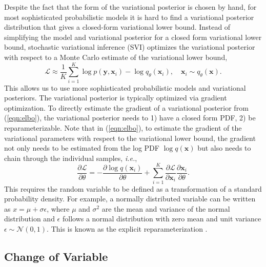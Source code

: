 \documentclass{article}
\newcommand{\yV}{\mathbf{y}}
\newcommand{\xV}{\mathbf{x}}
\newcommand{\bound}{\mathcal{L}}
\newcommand{\ie}{\textit{i.e.}}
\begin{document}
Despite the fact that the form of the variational posterior is chosen by hand, for most sophisticated probabilistic models it is hard to find a variational posterior distribution that gives a closed-form variational lower bound. Instead of simplifying the model and variational posterior for a closed form variational lower bound, stochastic variational inference (SVI) optimizes the variational posterior with respect to a Monte Carlo estimate of the variational lower bound,
\begin{equation}
\bound \approx \frac{1}{K} \sum_{i=1}^K \log p(\yV, \xV_i)-\log q_\theta(\xV_i), \quad \xV_i \sim q_\theta(\xV). \label{eqn:elbo}
\end{equation}
This allows us to use more sophisticated probabilistic models and variational posteriors. The variational posterior is typically optimized via gradient optimization. To directly estimate the gradient of a variational posterior from (\ref{eqn:elbo}), the variational posterior needs to 1) have a closed form PDF, 2) be reparameterizable.
%
Note that in (\ref{eqn:elbo}), to estimate the gradient of the variational parameters with respect to the variational lower bound, the gradient not only needs to be estimated from the log PDF $\log q(\xV)$ but also needs to chain through the individual samples, \ie, 
\begin{equation}
\frac{\partial \bound}{\partial \theta} = -\frac{\partial \log q(\xV_i)}{\partial \theta} + \sum_{i=1}^K \frac{\partial \bound}{\partial \xV_i} \frac{\partial \xV_i}{\partial \theta}. 
\end{equation}
%
This requires the random variable to be defined as a transformation of a standard probability density. For example, a normally distributed variable can be written as $x = \mu + \sigma\epsilon$, where $\mu$ and $\sigma^2$ are the mean and variance of the normal distribution and $\epsilon$ follows a normal distribution with zero mean and unit variance $\epsilon \sim \mathcal{N}(0, 1)$. This is known as  the explicit reparameterization \citep{KingmaWelling2014}. 


\subsection{Change of Variable}
\end{document}
